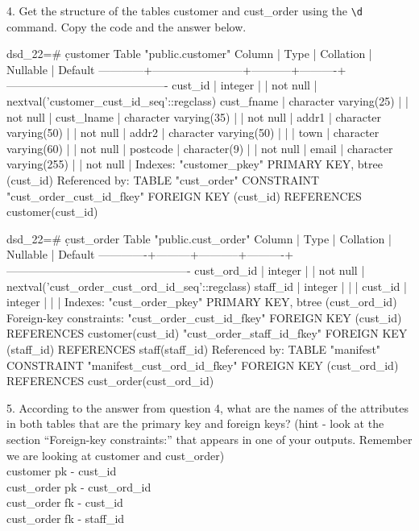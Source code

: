 4. Get the structure of the tables customer and cust\_order using the \verb|\d| command. Copy the code and the answer below.
\begin{pseudo*}
dsd_22=# \d customer
                                        Table "public.customer"
   Column   |          Type          | Collation | Nullable |                  Default
------------+------------------------+-----------+----------+-------------------------------------------
 cust_id    | integer                |           | not null | nextval('customer_cust_id_seq'::regclass)
 cust_fname | character varying(25)  |           | not null | 
 cust_lname | character varying(35)  |           | not null | 
 addr1      | character varying(50)  |           | not null | 
 addr2      | character varying(50)  |           |          | 
 town       | character varying(60)  |           | not null | 
 postcode   | character(9)           |           | not null | 
 email      | character varying(255) |           | not null | 
Indexes:
    "customer_pkey" PRIMARY KEY, btree (cust_id)
Referenced by:
    TABLE "cust_order" CONSTRAINT "cust_order_cust_id_fkey" FOREIGN KEY (cust_id) REFERENCES customer(cust_id)

dsd_22=# \d cust_order
                                   Table "public.cust_order"
   Column    |  Type   | Collation | Nullable |                     Default
-------------+---------+-----------+----------+-------------------------------------------------
 cust_ord_id | integer |           | not null | nextval('cust_order_cust_ord_id_seq'::regclass)
 staff_id    | integer |           |          | 
 cust_id     | integer |           |          | 
Indexes:
    "cust_order_pkey" PRIMARY KEY, btree (cust_ord_id)
Foreign-key constraints:
    "cust_order_cust_id_fkey" FOREIGN KEY (cust_id) REFERENCES customer(cust_id)
    "cust_order_staff_id_fkey" FOREIGN KEY (staff_id) REFERENCES staff(staff_id)
Referenced by:
    TABLE "manifest" CONSTRAINT "manifest_cust_ord_id_fkey" FOREIGN KEY (cust_ord_id) REFERENCES cust_order(cust_ord_id)
\end{pseudo*}

5. According to the answer from question 4, what are the names of the attributes in both tables that are the primary key and foreign keys? (hint - look at the section “Foreign-key constraints:” that appears in one of your outputs. Remember we are looking at customer and cust\_order)\\
customer pk - cust\_id\\
cust\_order pk - cust\_ord\_id\\
cust\_order fk - cust\_id\\
cust\_order fk - staff\_id


